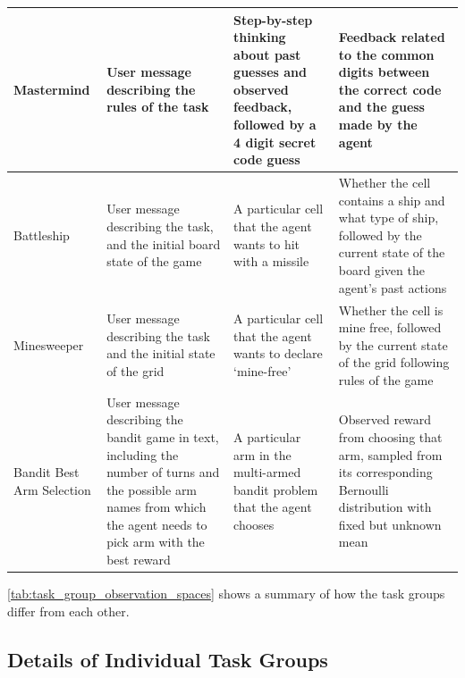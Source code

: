 \documentclass{article}
\theoremstyle{plain}
\theoremstyle{definition}
\theoremstyle{remark}
\begin{document}
\begin{table}[h!]
\begin{tabular}{|l|p{4cm}|p{4cm}|p{4cm}|}
\hline
Mastermind & User message describing the rules of the task & Step-by-step thinking about past guesses and observed feedback, followed by a 4 digit secret code guess & Feedback related to the common digits between the correct code and the guess made by the agent \\
\hline
Battleship & User message describing the task, and the initial board state of the game & A particular cell that the agent wants to hit with a missile & Whether the cell contains a ship and what type of ship, followed by the current state of the board given the agent's past actions \\
\hline
Minesweeper & User message describing the task and the initial state of the grid & A particular cell that the agent wants to declare `mine-free’ & Whether the cell is mine free, followed by the current state of the grid following rules of the game \\
\hline
Bandit Best Arm Selection & User message describing the bandit game in text, including the number of turns and the possible arm names from which the agent needs to pick arm with the best reward & A particular arm in the multi-armed bandit problem that the agent chooses & Observed reward from choosing that arm, sampled from its corresponding Bernoulli distribution with fixed but unknown mean \\
\hline
\end{tabular}
\end{table}
\cref{tab:task_group_observation_spaces} shows a summary of how the task groups differ from each other.
\newpage
\subsection{Details of Individual Task Groups}
\end{document}
